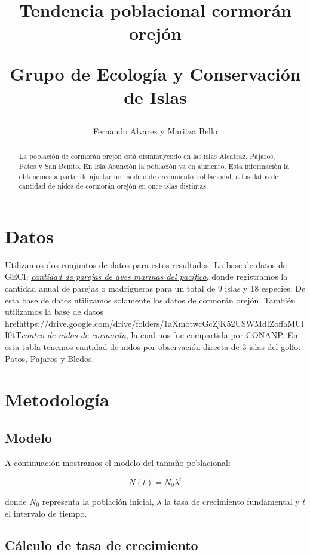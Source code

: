 \documentclass{article} %
\author{Fernando Alvarez y Maritza Bello}
\title{Tendencia poblacional cormorán orejón \\ \begin{large} Grupo de Ecología y Conservación de Islas \end{large}}
\begin{document}
\maketitle

\begin{abstract}
La población de cormorán orejón está disminuyendo en las islas Alcatraz, Pájaros, Patos y San Benito. En Isla Asunción la población va en aumento. Esta información la obtenemos a partir de ajustar un modelo de crecimiento poblacional, a los datos de cantidad de nidos de cormorán orejón en once islas distintas.

\end{abstract}

\section*{Datos}

Utilizamos dos conjuntos de datos para estos resultados. La base de datos de GECI: \href{https://drive.google.com/drive/u/0/folders/1K2-itQXbNXPhrz4Pb3eRr9NG9A4rR47o}{{\color{blue}\textit{\underline{cantidad de parejas de aves marinas del pacífico}}}}, donde registramos la cantidad anual de parejas o madrigueras para un total de 9 islas y 18 especies. De esta base de datos utilizamos solamente los datos de cormorán orejón. También utilizamos la base de datos href{https://drive.google.com/drive/folders/1aXmotwcGcZjK52USWMdlZoffaMUlI0tT}{{\color{blue}\textit{\underline{conteo de nidos de cormorán}}}}, la cual nos fue compartida por CONANP. En esta tabla tenemos cantidad de nidos por observación directa de 3 islas del golfo: Patos, Pajaros y Bledos.


\section*{Metodología}
\subsection*{Modelo}
A continuación mostramos el modelo del tamaño poblacional:

\begin{equation}
N(t)=N_{0}\lambda^{t}
\end{equation}

\noindent donde $N_{0}$ representa la población inicial, $\lambda$ la tasa de crecimiento fundamental y $t$ el intervalo de tiempo. 

\subsection*{Cálculo de tasa de crecimiento}
\end{document}
